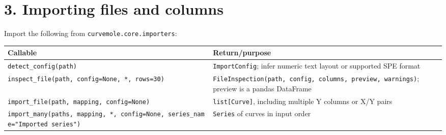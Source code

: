 \documentclass[
  10pt,
  a4paper,
  oneside]{scrreprt}
\begin{document}
\hypertarget{importing-files-and-columns}{%
\section{3. Importing files and
columns}\label{importing-files-and-columns}}

Import the following from \texttt{curvemole.core.importers}:

\begin{longtable}[]{@{}ll@{}}
\toprule
\begin{minipage}[b]{0.47\columnwidth}\raggedright
Callable\strut
\end{minipage} & \begin{minipage}[b]{0.47\columnwidth}\raggedright
Return/purpose\strut
\end{minipage}\tabularnewline
\midrule
\endhead
\begin{minipage}[t]{0.47\columnwidth}\raggedright
\texttt{detect\_config(path)}\strut
\end{minipage} & \begin{minipage}[t]{0.47\columnwidth}\raggedright
\texttt{ImportConfig}; infer numeric text layout or supported SPE
format\strut
\end{minipage}\tabularnewline
\begin{minipage}[t]{0.47\columnwidth}\raggedright
\texttt{inspect\_file(path,\ config=None,\ *,\ rows=30)}\strut
\end{minipage} & \begin{minipage}[t]{0.47\columnwidth}\raggedright
\texttt{FileInspection(path,\ config,\ columns,\ preview,\ warnings)};
preview is a pandas DataFrame\strut
\end{minipage}\tabularnewline
\begin{minipage}[t]{0.47\columnwidth}\raggedright
\texttt{import\_file(path,\ mapping,\ config=None)}\strut
\end{minipage} & \begin{minipage}[t]{0.47\columnwidth}\raggedright
\texttt{list{[}Curve{]}}, including multiple Y columns or X/Y
pairs\strut
\end{minipage}\tabularnewline
\begin{minipage}[t]{0.47\columnwidth}\raggedright
\texttt{import\_many(paths,\ mapping,\ *,\ config=None,\ series\_name="Imported\ series")}\strut
\end{minipage} & \begin{minipage}[t]{0.47\columnwidth}\raggedright
\texttt{Series} of curves in input order\strut
\end{minipage}\tabularnewline

\end{longtable}
\end{document}
